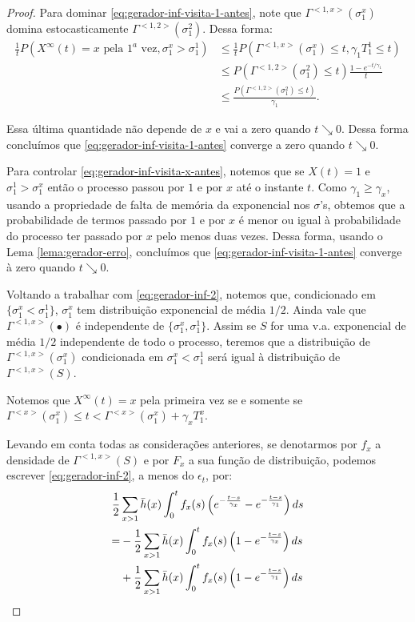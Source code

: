 \begin{proof}
  Para dominar \eqref{eq:gerador-inf-visita-1-antes}, note que
  $\Gamma^{<1, x>}(\sigma_1^x)$ domina estocasticamente $\Gamma^{<1,
    2>}(\sigma_1^2)$. Dessa forma:
  \begin{align*}
    \frac{1}{t} P\left(
      X^\infty(t) = x \text{ pela } 1^a \text{ vez},
      \sigma^x_1 > \sigma^1_1
    \right)
    & \leq \frac{1}{t} P(\Gamma^{<1, x>}(\sigma^x_1) \leq t, \gamma_1 T^1_1 \leq
    t)\\
    &\leq P(\Gamma^{<1, 2>}(\sigma^2_1) \leq t) \frac{1 -
      e^{-t/\gamma_1}}{t}\\
    &\leq \frac{P(\Gamma^{<1, 2>}(\sigma^2_1) \leq t)}{\gamma_1}.
  \end{align*}

  Essa última quantidade não depende de $x$ e vai a zero quando $t
  \searrow 0$. Dessa forma concluímos que
  \eqref{eq:gerador-inf-visita-1-antes} converge a zero quando $t
  \searrow 0$.    

  Para controlar \eqref{eq:gerador-inf-visita-x-antes}, notemos que se
  $X(t) = 1$ e $\sigma_1^1 > \sigma_1^x$ então o processo passou por $1$
  e por $x$ até o instante $t$. Como $\gamma_1 \geq \gamma_x$, usando
  a propriedade de falta de memória da exponencial nos $\sigma$'s,
  obtemos que a probabilidade de termos passado por $1$ e por $x$ é
  menor ou igual à probabilidade do processo ter passado por $x$ pelo
  menos duas vezes. Dessa forma, usando o Lema
  \ref{lema:gerador-erro}, concluímos que
  \eqref{eq:gerador-inf-visita-1-antes} converge à zero quando $t
  \searrow 0$.

  
  Voltando a trabalhar com \eqref{eq:gerador-inf-2}, notemos que,
  condicionado em $\{\sigma^x_1 < \sigma^1_1\}$, $\sigma^x_1$ tem
  distribuição exponencial de média $1/2$. Ainda vale que $\Gamma^{<1,
    x>}(\bullet)$ é independente de $\{\sigma^x_1,
  \sigma^1_1\}$. Assim se $S$ for uma v.a. exponencial de média $1/2$
  independente de todo o processo, teremos que a distribuição de
  $\Gamma^{<1, x>}(\sigma_1^x)$ condicionada em $\sigma^x_1 <
  \sigma_1^1$ será igual à distribuição de $\Gamma^{<1, x>}(S)$.


  Notemos que $X^\infty(t) = x$ pela primeira vez se e somente se
  $\Gamma^{<x>}(\sigma^x_1) \leq t < \Gamma^{<x>}(\sigma^x_1) +
  \gamma_x T^x_1$.

  Levando em conta todas as considerações anteriores, se denotarmos
  por $f_x$ a densidade de $\Gamma^{<1, x>}(S)$ e por $F_x$ a sua
  função de distribuição, podemos escrever \eqref{eq:gerador-inf-2}, a
  menos do $\epsilon_t$, por:
  \begin{align}
     \frac{1}{2} &\sum_{x > 1} \bar{h}(x) \int_0^t f_x (s) \left(
      e^{-\frac{t-s}{\gamma_x}} - e^{-\frac{t-s}{\gamma_1}}
    \right) d s \notag\\
    \label{eq:gerador-inf-3}
    = &- \frac{1}{2} \sum_{x > 1} \bar{h}(x) \int_0^t f_x (s) \left(
      1 - e^{-\frac{t-s}{\gamma_x}}
    \right) d s\\
    \label{eq:gerador-inf-4}
    &+ \frac{1}{2} \sum_{x > 1} \bar{h}(x) \int_0^t f_x (s) \left(
      1 - e^{-\frac{t-s}{\gamma_1}}
    \right) d s
  \end{align}


\end{proof}
